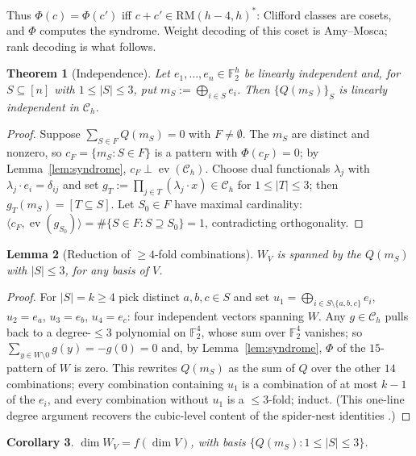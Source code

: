 \documentclass[11pt]{article}
\newtheorem{theorem}{Theorem}
\newtheorem{lemma}[theorem]{Lemma}
\newtheorem{corollary}[theorem]{Corollary}
\theoremstyle{definition}
\theoremstyle{remark}
\newcommand{\F}{\mathbb{F}_2}
\newcommand{\RM}{\mathrm{RM}}
\newcommand{\ev}{\operatorname{ev}}
\newcommand{\Ch}{\mathcal{C}_h}
\newcommand{\ip}[2]{\langle #1,#2\rangle}
\begin{document}
Thus $\Phi(c)=\Phi(c')$ iff $c+c'\in\RM(h-4,h)^{*}$: Clifford classes are cosets, and $\Phi$ computes
the syndrome. Weight decoding of this coset is Amy--Mosca; rank decoding is what follows.

\begin{theorem}[Independence]\label{thm:indep}
Let $e_1,\dots,e_n\in\F^h$ be linearly independent and, for $S\subseteq[n]$ with
$1\le|S|\le3$, put $m_S:=\bigoplus_{i\in S}e_i$. Then $\{Q(m_S)\}_S$ is linearly independent in $\Ch$.
\end{theorem}
\begin{proof}
Suppose $\sum_{S\in F}Q(m_S)=0$ with $F\ne\emptyset$. The $m_S$ are distinct and nonzero, so $c_F=
\{m_S:S\in F\}$ is a pattern with $\Phi(c_F)=0$; by Lemma~\ref{lem:syndrome}, $c_F\perp\ev(\Ch)$. Choose dual functionals
$\lambda_j$ with $\lambda_j\cdot e_i=\delta_{ij}$ and set $g_T:=\prod_{j\in T}(\lambda_j\cdot x)\in\Ch$ for $1\le|T|\le3$; then $g_T(m_S)=[T\subseteq S]$.
Let $S_0\in F$ have maximal cardinality: $\ip{c_F}{\ev(g_{S_0})}=\#\{S\in F:S\supseteq S_0\}=1$, contradicting
orthogonality.
\end{proof}

\begin{lemma}[Reduction of $\ge4$-fold combinations]\label{lem:reduce}
$W_V$ is spanned by the $Q(m_S)$ with $|S|\le3$,
for any basis of $V$.
\end{lemma}
\begin{proof}
For $|S|=k\ge4$ pick distinct $a,b,c\in S$ and set $u_1=\bigoplus_{i\in S\setminus\{a,b,c\}}e_i$, $u_2=e_a$, $u_3=
e_b$, $u_4=e_c$: four independent vectors spanning $W$. Any $g\in\Ch$ pulls back to a degree-$\le3$
polynomial on $\F^4$, whose sum over $\F^4$ vanishes; so $\sum_{y\in W\setminus0}g(y)=-g(0)=0$ and, by
Lemma~\ref{lem:syndrome}, $\Phi$ of the $15$-pattern of $W$ is zero. This rewrites $Q(m_S)$ as the sum of $Q$ over the
other $14$ combinations; every combination containing $u_1$ is a combination of at most $k-1$ of
the $e_i$, and every combination without $u_1$ is a $\le3$-fold; induct. (This one-line degree argument
recovers the cubic-level content of the spider-nest identities \cite{dBBW20}.)
\end{proof}

\begin{corollary}\label{cor:dim}
$\dim W_V=f(\dim V)$, with basis $\{Q(m_S):1\le|S|\le3\}$.
\end{corollary}
\end{document}
